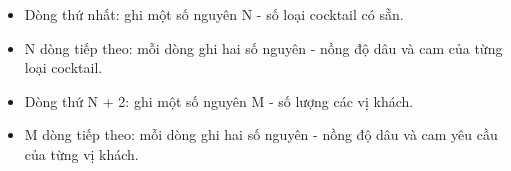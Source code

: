 \begin{itemize}
	\item     Dòng thứ nhất: ghi một số nguyên N - số loại cocktail có sẵn.   
	\item     N dòng tiếp theo: mỗi dòng ghi hai số nguyên - nồng độ dâu và cam của từng loại cocktail.   
	\item     Dòng thứ N + 2: ghi một số nguyên M - số lượng các vị khách.   
	\item     M dòng tiếp theo: mỗi dòng ghi hai số nguyên - nồng độ dâu và cam yêu cầu của từng vị khách.   
\end{itemize}